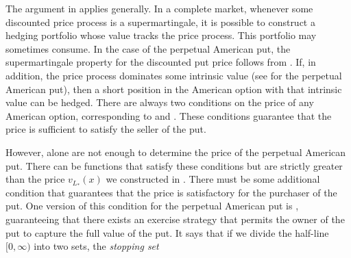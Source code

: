 The argument in  applies generally. In a complete market, whenever some discounted price process is a supermartingale, it is possible to construct a hedging portfolio whose value tracks the price process. This portfolio may sometimes consume. In the case of the perpetual American put, the supermartingale property for the discounted put price follows from . If, in addition, the price process dominates some intrinsic value (see  for the perpetual American put), then a short position in the American option with that intrinsic value can be hedged. There are always two conditions on the price of any American option, corresponding to  and . These conditions guarantee that the price is sufficient to satisfy the seller of the put.

However,  alone are not enough to determine the price of the perpetual American put. There can be functions that satisfy these conditions but are strictly greater than the price $v_{L_*}(x)$ we constructed in . There must be some additional condition that guarantees that the price is satisfactory for the purchaser of the put. One version of this condition for the perpetual American put is , guaranteeing that there exists an exercise strategy that permits the owner of the put to capture the full value of the put. It says that if we divide the half-line $[0,\infty)$ into two sets, the \textit{stopping set}

